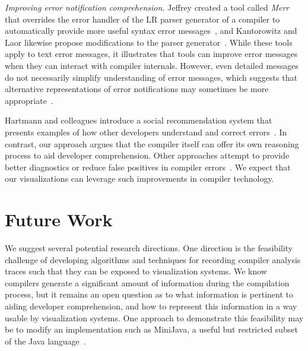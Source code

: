 \documentclass[conference]{IEEEtran}
\begin{document}
\textit{Improving error notification comprehension.} Jeffrey created a tool called \textit{Merr} that overrides the error handler of the LR parser generator of a compiler to automatically provide more useful syntax error messages~\cite{Jeffery2003}, and Kantorowitz and Laor likewise propose modifications to the parser generator~\cite{Kantorowitz1986}. While these tools apply to text error messages, it illustrates that tools can improve error messages when they can interact with compiler internals. However, even detailed messages do not necessarily simplify understanding of error messages, which suggests that alternative representations of error notifications may sometimes be more appropriate~\cite{Nienaltowski2008,Denny2014}. 

Hartmann and colleagues introduce a social recommendation system that presents examples of how other developers understand and correct errors~\cite{Hartmann2010}. In contrast, our approach argues that the compiler itself can offer its own reasoning process to aid developer comprehension. Other approaches attempt to provide better diagnostics or reduce false positives in compiler errors~\cite{Boustani2011,Campbell2014}. We expect that our visualizations can leverage such improvements in compiler technology. 




\section{Future Work}

We suggest several potential research directions. One direction is the feasibility challenge of developing algorithms and techniques for recording compiler analysis traces such that they can be exposed to visualization systems. We know compilers generate a significant amount of information during the compilation process, but it remains an open question as to what information is pertinent to aiding developer comprehension, and how to represent this information in a way usable by visualization systems. One approach to demonstrate this feasibility may be to modify an implementation such as MiniJava, a useful but restricted subset of the Java language~\cite{Roberts2001}.
\end{document}
